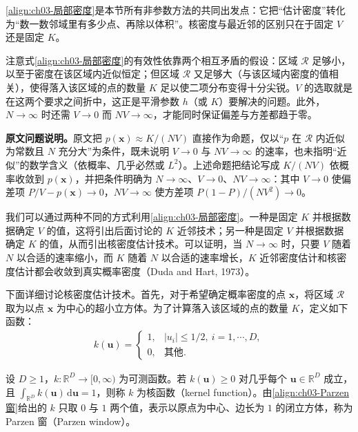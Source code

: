 \documentclass[../../main.tex]{subfiles}
\begin{document}
\begin{remark}
\eqref{align:ch03-局部密度}是本节所有非参数方法的共同出发点：它把“估计密度”转化为“数一数邻域里有多少点、再除以体积”。核密度与最近邻的区别只在于固定 $V$ 还是固定 $K$。

注意式\eqref{align:ch03-局部密度}的有效性依靠两个相互矛盾的假设：区域 $\mathcal{R}$ 足够小，以至于密度在该区域内近似恒定；但区域 $\mathcal{R}$ 又足够大（与该区域内密度的值相关），使得落入该区域的点的数量 $K$ 足以使二项分布变得十分尖锐。$V$ 的选取就是在这两个要求之间折中，这正是平滑参数 $h$（或 $K$）要解决的问题。此外，$N\to\infty$ 时还需 $V\to0$ 而 $NV\to\infty$，才能同时保证偏差与方差都趋于零。

\textbf{原文问题说明。}原文把 $p(\boldsymbol{x})\approx K/(NV)$ 直接作为命题，仅以“$p$ 在 $\mathcal{R}$ 内近似为常数且 $N$ 充分大”为条件，既未说明 $V\to0$ 与 $NV\to\infty$ 的速率，也未指明“近似”的数学含义（依概率、几乎必然或 $L^{2}$）。上述命题把结论写成 $K/(NV)$ 依概率收敛到 $p(\boldsymbol{x})$，并把条件明确为 $N\to\infty$、$V\to0$、$NV\to\infty$：其中 $V\to0$ 使偏差项 $P/V-p(\boldsymbol{x})\to0$，$NV\to\infty$ 使方差项 $P(1-P)/(NV^{2})\to0$。
\end{remark}

我们可以通过两种不同的方式利用\eqref{align:ch03-局部密度}。一种是固定 $K$ 并根据数据确定 $V$ 的值，这将引出后面讨论的 $K$ 近邻技术；另一种是固定 $V$ 并根据数据确定 $K$ 的值，从而引出核密度估计技术。可以证明，当 $N\to\infty$ 时，只要 $V$ 随着 $N$ 以合适的速率缩小，而 $K$ 随着 $N$ 以合适的速率增长，$K$ 近邻密度估计和核密度估计都会收敛到真实概率密度（Duda and Hart, 1973）。

下面详细讨论核密度估计技术。首先，对于希望确定概率密度的点 $\boldsymbol{x}$，将区域 $\mathcal{R}$ 取为以点 $\boldsymbol{x}$ 为中心的超小立方体。为了计算落入该区域的点的数量 $K$，定义如下函数：
\begin{align}
k(\boldsymbol{u})=\begin{cases}1, & \lvert u_i\rvert\leqslant1/2,\ i=1,\cdots,D,\\ 0, & \text{其他}.\end{cases}
\label{align:ch03-Parzen窗}
\end{align}

\begin{definition}\label{definition:ch03-核函数}
设 $D\geqslant1$，$k:\mathbb{R}^{D}\to[0,\infty)$ 为可测函数。若 $k(\boldsymbol{u})\geqslant0$ 对几乎每个 $\boldsymbol{u}\in\mathbb{R}^{D}$ 成立，且 $\int_{\mathbb{R}^{D}}k(\boldsymbol{u})\,\mathrm{d}\boldsymbol{u}=1$，则称 $k$ 为核函数（kernel function）。由\eqref{align:ch03-Parzen窗}给出的 $k$ 只取 $0$ 与 $1$ 两个值，表示以原点为中心、边长为 $1$ 的闭立方体，称为 Parzen 窗（Parzen window）。
\end{definition}
\end{document}
